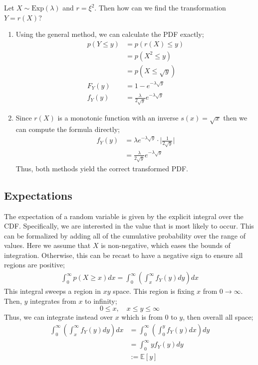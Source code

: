 \begin{example}
	Let $X \sim \text{Exp}(\lambda)$ and $r = \xi^2$. Then how can we find the transformation $Y = r(X)$?

	\begin{enumerate}
		\item Using the general method, we can calculate the PDF exactly; 
		\begin{align*}
			p(Y \leq y) &= p(r(X) \leq y)\\
			 			&= p(X^2 \leq y) \\
						&= p(X \leq \sqrt{y}) \\
			F_Y(y) &= 1 - e^{-\lambda \sqrt{y}}\\
			f_Y(y) &= \frac{\lambda}{2\sqrt{y}}e^{-\lambda \sqrt{y}}
		\end{align*}
		\item Since $r(X)$ is a monotonic function with an inverse $s(x) = \sqrt{x}$ then we can compute the formula directly;
		\begin{align*}
			f_Y(y) &= \lambda e^{-\lambda \sqrt{y}} \cdot \Bigg| \frac{1}{2\sqrt{y}}\Bigg| \\
			&=\frac{\lambda}{2\sqrt{y}}e^{-\lambda \sqrt{y}}
		\end{align*}
		Thus, both methods yield the correct transformed PDF.
	\end{enumerate}
\end{example}

\subsection{Expectations}

The expectation of a random variable is given by the explicit integral over the CDF. Specifically, we are interested in the value that is most likely to occur. This can be formalized by adding all of the cumulative probability over the range of values. Here we assume that $X$ is non-negative, which eases the bounds of integration. Otherwise, this can be recast to have a negative sign to ensure all regions are positive;
\begin{align*}
	\int_0^\infty p(X \geq x) dx = \int_0^\infty \left( \int_x^\infty f_Y(y) dy \right) dx
\end{align*}
This integral sweeps a region in $xy$ space. This region is fixing $x$ from $0 \rightarrow \infty$. Then, $y$ integrates from $x$ to infinity; 
\[
0 \leq x, \quad x \leq y \leq \infty
\]
Thus, we can integrate instead over $x$ which is from $0$ to $y$, then overall all space;
\begin{align*}
	\int_0^\infty \left( \int_x^\infty f_Y(y) dy \right) dx &= \int_0^\infty \left( \int_0^y f_Y(y) dx \right) dy \\
	&= \int_0^\infty y f_Y(y) dy \\
	&:= \mathbb{E}[y]
\end{align*}

